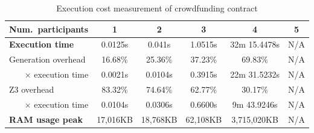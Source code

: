 \documentclass[english,runningheads]{llncs}
\begin{document}
\begin{table}[]
{\begin{tabular}{l||lllll}
\textbf{Num.~participants}             & \multicolumn{1}{c|}{1}        & \multicolumn{1}{c|}{2}        & \multicolumn{1}{c|}{3}        & \multicolumn{1}{c|}{4}            & \multicolumn{1}{c}{5}    \\ \hline
\textbf{Execution time}                & \multicolumn{1}{c|}{0.0125s}  & \multicolumn{1}{c|}{0.041s}   & \multicolumn{1}{c|}{1.0515s}  & \multicolumn{1}{c|}{32m 15.4478s} & \multicolumn{1}{c}{\color[HTML]{888888} N/A} \\ \hline
Generation overhead                    & \multicolumn{1}{c|}{16.68\%}  & \multicolumn{1}{c|}{25.36\%}  & \multicolumn{1}{c|}{37.23\%}  & \multicolumn{1}{c|}{69.83\%}      & \multicolumn{1}{c}{\color[HTML]{888888} N/A} \\ \hline
\multicolumn{1}{r||}{× execution time} & \multicolumn{1}{c|}{0.0021s}  & \multicolumn{1}{c|}{0.0104s}  & \multicolumn{1}{c|}{0.3915s}  & \multicolumn{1}{c|}{22m 31.5232s} & \multicolumn{1}{c}{\color[HTML]{888888} N/A} \\ \hline
Z3 overhead                            & \multicolumn{1}{c|}{83.32\%}  & \multicolumn{1}{c|}{74.64\%}  & \multicolumn{1}{c|}{62.77\%}  & \multicolumn{1}{c|}{30.17\%}      & \multicolumn{1}{c}{\color[HTML]{888888} N/A} \\ \hline
\multicolumn{1}{r||}{× execution time} & \multicolumn{1}{c|}{0.0104s}  & \multicolumn{1}{c|}{0.0306s}  & \multicolumn{1}{c|}{0.6600s}  & \multicolumn{1}{c|}{9m 43.9246s}  & \multicolumn{1}{c}{\color[HTML]{888888} N/A} \\ \hline
\textbf{RAM usage peak}                & \multicolumn{1}{c|}{17,016KB} & \multicolumn{1}{c|}{18,768KB} & \multicolumn{1}{c|}{62,108KB} & \multicolumn{1}{c|}{3,715,020KB}  & \multicolumn{1}{c}{\color[HTML]{888888} N/A}
\end{tabular}
}
\caption{Execution cost measurement of crowdfunding contract\label{table2}}
\end{table}
\end{document}
